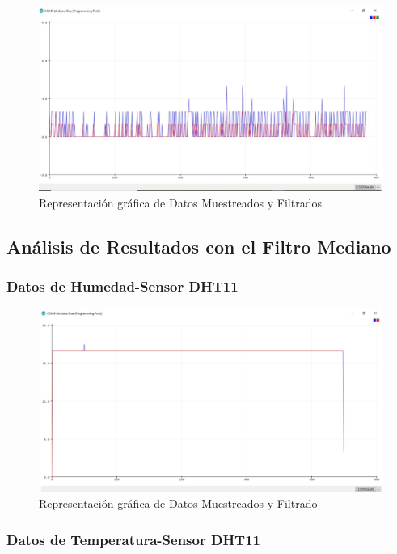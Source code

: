 \documentclass[10pt,a4paper]{article}
\begin{document}
\begin{multicols}{2}
\begin{itemize}
\begin{figure}[H]
\centering
\includegraphics[scale=0.30]{meduv.PNG}
\caption{Representación gráfica de Datos Muestreados y Filtrados}
\end{figure}



\subsection{Análisis de Resultados con el Filtro Mediano}

\subsubsection{Datos de Humedad-Sensor DHT11}

\begin{figure}[H]
\centering
\includegraphics[scale=0.30]{gausstemperatura.PNG}
\caption{Representación gráfica de Datos Muestreados y Filtrado}
\end{figure}


\subsubsection{Datos de Temperatura-Sensor DHT11}


\end{itemize}
\end{multicols}
\end{document}
